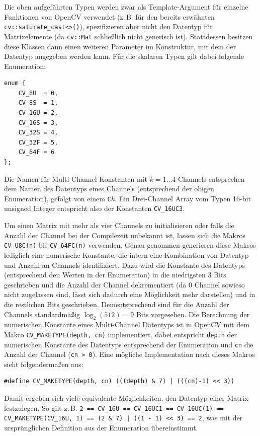\documentclass{whswinvcbook}
\begin{document}
Die oben aufgeführten Typen werden zwar als Template-Argument für einzelne Funktionen von OpenCV verwendet (z.\,B. für den bereits erwähnten \texttt{cv::saturate\_cast<>()}), spezifizieren aber nicht den Datentyp für Matrixelemente (da \texttt{cv::Mat} schließlich nicht generisch ist). Stattdessen besitzen diese Klassen dann einen weiteren Parameter im Konstruktur, mit dem der Datentyp angegeben werden kann. Für die skalaren Typen gilt dabei folgende Enumeration:
\begin{lstlisting}[numbers=none,frame=none]
enum {
    CV_8U  = 0,
    CV_8S  = 1,
    CV_16U = 2,
    CV_16S = 3,
    CV_32S = 4,
    CV_32F = 5,
    CV_64F = 6
};
\end{lstlisting}
Die Namen für Multi-Channel Konstanten mit $k=1\dots4$ Channels entsprechen dem Namen des Datentyps eines Channels (entsprechend der obigen Enumeration), gefolgt von einem \texttt{C}$k$. Ein Drei-Channel Array vom Typen 16-bit unsigned Integer entspricht also der Konstanten \texttt{CV\_16UC3}.

Um einen Matrix mit mehr als vier Channels zu initialisieren oder falls die Anzahl der Channel bei der Compilezeit unbekannt ist, lassen sich die Makros \texttt{CV\_U8C(n)} bis \texttt{CV\_64FC(n)} verwenden. Genau genommen generieren diese Makros lediglich eine numerische Konstante, die intern eine Kombination von Datentyp und Anzahl an Channels identifiziert. Dazu wird die Konstante des Datentyps (entsprechend den Werten in der Enumeration) in die niedrigsten 3 Bits geschrieben und die Anzahl der Channel dekrementiert (da $0$ Channel sowieso nicht zugelassen sind, lässt sich dadurch eine Möglichkeit mehr darstellen) und in die restlichen Bits geschrieben. Dementsprechend sind für die Anzahl der Channels standardmäßig $\log_2(512)=9$ Bits vorgesehen. Die Berechnung der numerischen Konstante eines Multi-Channel Datentyps ist in OpenCV mit dem Makro \texttt{CV\_MAKETYPE(depth, cn)} implementiert, dabei entspricht \texttt{depth} der numerischen Konstante des Datentyps entsprechend der Enumeration und \texttt{cn} die Anzahl der Channel (\texttt{cn > 0}). Eine mögliche Implementation nach \cite{opencv4} dieses Makros sieht folgendermaßen aus:
\begin{lstlisting}[numbers=none,frame=none]
#define CV_MAKETYPE(depth, cn) (((depth) & 7) | (((cn)-1) << 3))
\end{lstlisting}
Damit ergeben sich viele equivalente Möglichkeiten, den Datentyp einer Matrix festzulegen. So gilt z.\,B. \texttt{2 == CV\_16U == CV\_16UC1 == CV\_16UC(1) == CV\_MAKETYPE(CV\_16U, 1) == (2 \& 7) | ((1 - 1) << 3) == 2}, was mit der ursprünglichen Definition aus der Enumeration übereinstimmt.
\end{document}
